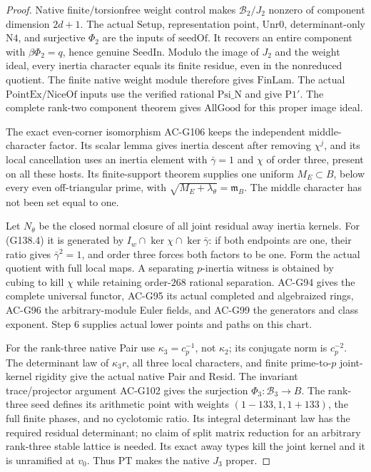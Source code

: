 \begin{proof}
Native finite/torsionfree weight control makes
\(\mathcal B_2/J_2\) nonzero of component dimension
\(2d+1\).  The actual \(\mathrm{Setup}\), representation
point, \(\mathrm{Unr0}\), determinant-only \(\mathrm{N4}\),
and surjective \(\Phi_2\) are the inputs of
\(\mathrm{seedOf}\).  It recovers an entire component
with \(\beta\Phi_2=q\), hence genuine \(\mathrm{SeedIn}\).
Modulo the image of \(J_2\) and the weight ideal, every
inertia character equals its finite residue, even in the
nonreduced quotient.  The finite native weight module
therefore gives \(\mathrm{FinLam}\).
The actual \(\mathrm{PointEx}/\mathrm{NiceOf}\) inputs
use the verified rational \(\mathrm{Psi\_N}\) and give
\(\mathrm{P1'}\).  The complete rank-two component theorem
gives \(\mathrm{AllGood}\) for this proper image ideal.

The exact even-corner isomorphism AC-G106 keeps the
independent middle-character factor.  Its scalar lemma
gives inertia descent after removing \(\chi^j\), and
its local cancellation uses an inertia element with
\(\bar\gamma=1\) and \(\chi\) of order three, present on
all these hosts.  Its finite-support theorem supplies
one uniform \(M_E\subset B\), below every even
off-triangular prime, with
\(\sqrt{M_E+\lambda_\theta}=\mathfrak m_B\).
The middle character has not been set equal to one.

Let \(N_\theta\) be the closed normal closure of all joint
residual away inertia kernels.  For (G138.4) it is generated
by \(I_w\cap\ker\chi\cap\ker\bar\gamma\): if both endpoints
are one, their ratio gives \(\bar\gamma^2=1\), and order three
forces both factors to be one.  Form the actual quotient
with full local maps.  A separating \(p\)-inertia witness
is obtained by cubing to kill \(\chi\) while retaining
order-\(268\) rational separation.
AC-G94 gives the complete universal functor, AC-G95 its
actual completed and algebraized rings, AC-G96 the
arbitrary-module Euler fields, and AC-G99 the generators
and class exponent.  Step 6 supplies actual lower points
and paths on this chart.

For the rank-three native Pair use \(\kappa_3=c_p^{-1}\),
not \(\kappa_2\); its conjugate norm is \(c_p^{-2}\).
The determinant law of \(\kappa_3r\), all three local
characters, and finite prime-to-\(p\) joint-kernel rigidity
give the actual native Pair and Resid.  The invariant
trace/projector argument AC-G102 gives the surjection
\(\Phi_3:\mathcal B_3\to B\).
The rank-three seed defines its arithmetic point with
weights \((1-133,1,1+133)\), the full finite phases, and
no cyclotomic ratio.  Its integral determinant law has
the required residual determinant; no claim of split
matrix reduction for an arbitrary rank-three stable
lattice is needed.  Its exact away types kill the
joint kernel and it is unramified at \(v_0\).
Thus \(\mathrm{PT}\) makes the native \(J_3\) proper.


\end{proof}
